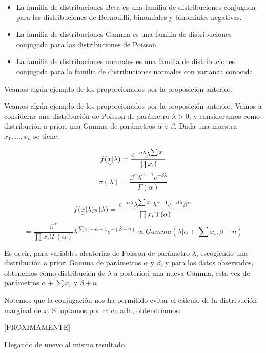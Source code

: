 \documentclass{article}
\begin{document}
\begin{prop}
	$ $ \newline
	\begin{itemize}
		\item La familia de distribuciones Beta es una familia de distribuciones conjugada para las distribuciones de Bernouilli, binomiales y binomiales negativas.

		\item La familia de distribuciones Gamma es una familia de distribuciones conjugada para las distribuciones de Poisson.%

		\item La familia de distribuciones normales es una familia de distribuciones conjugada para la familia de distribuciones normales con varianza conocida.
	\end{itemize}
\end{prop}

Veamos algún ejemplo de los proporcionados por la proposición anterior.

\begin{ex}
	Veamos algún ejemplo de los proporcionados por la proposición anterior. Vamos a considerar una distribución de Poisson de parámetro $\lambda > 0$, y consideramos como distribución a priori una Gamma de parámetros $\alpha$ y $\beta$. Dada una muestra $x_1,\dots,x_n$ se tiene:

	\[f(\underset{\sim}{x}|\lambda) = \frac{e^{-n\lambda}\lambda^{\sum{x_i}}}{\prod{x_i!}}\]
	\[\pi(\lambda)=\frac{\beta^{\alpha}\lambda^{\alpha-1}e^{-\beta\lambda}}{\Gamma(\alpha)}\]

	\[f(\underset{\sim}{x}|\lambda)\pi(\lambda)=\frac{e^{-n\lambda}\lambda^{\sum{x_i}}\lambda^{\alpha-1}e^{-\beta\lambda}\beta^\alpha}{\prod{x_i!}\Gamma(\alpha)}\]
	\[=\frac{\beta^{\alpha}}{\prod{x_i!}\Gamma(\alpha)}\lambda^{\sum{x_i}+\alpha-1}e^{-(\beta+n)}\propto Gamma\left(\lambda|\alpha+\sum{x_i},\beta+n\right) \]

	Es decir, para variables aleatorias de Poisson de parámetro $\lambda$, escogiendo una distribución a priori Gamma de parámetros $\alpha$ y $\beta$, y para los datos observados, obtenemos como distribución de $\lambda$ a posteriori una nueva Gamma, esta vez de parámetros $\alpha + \sum{x_i}$ y $\beta+n$.

	Notemos que la conjugación nos ha permitido evitar el cálculo de la distribución marginal de $x$. Si optamos por calcularla, obtendríamos:

	[PROXIMAMENTE]

	Llegando de nuevo al mismo resultado.
\end{ex}
\end{document}
